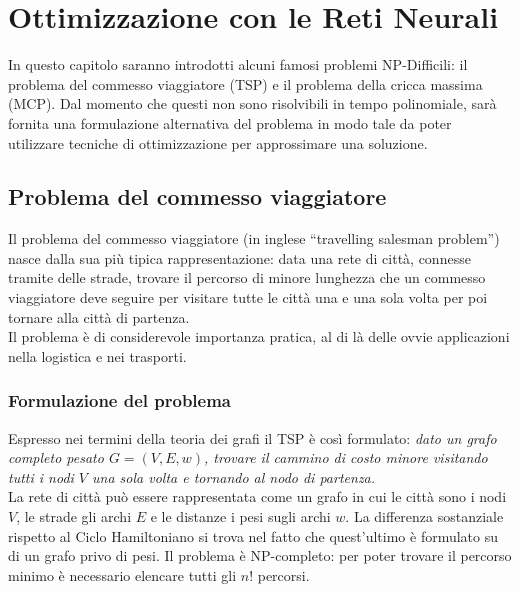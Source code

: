 
\chapter{Ottimizzazione con le Reti Neurali} %
\label{cha:ottimizzazione_con_le_reti_neurali}
In questo capitolo saranno introdotti alcuni famosi problemi NP-Difficili: il problema del commesso viaggiatore (TSP) e il problema della cricca massima (MCP). Dal momento che questi non sono risolvibili in tempo polinomiale, sarà fornita una formulazione alternativa del problema in modo tale da poter utilizzare tecniche di ottimizzazione per approssimare una soluzione.

\section{Problema del commesso viaggiatore} %
\label{sec:problema_del_commesso_viaggiatore}
Il problema del commesso viaggiatore (in inglese “travelling salesman problem”) nasce dalla sua più tipica rappresentazione: data una rete di città, connesse tramite delle strade, trovare il percorso di minore lunghezza che un commesso viaggiatore deve seguire per visitare tutte le città una e una sola volta per poi tornare alla città di partenza.\\

Il problema è di considerevole importanza pratica, al di là delle ovvie applicazioni nella logistica e nei trasporti.


\subsection{Formulazione del problema} %
\label{sub:formulazione_del_problema}
Espresso nei termini della teoria dei grafi il TSP è così formulato: \emph{dato un grafo completo pesato $G=(V, E, w)$, trovare il cammino di costo minore visitando tutti i nodi $V$ una sola volta e tornando al nodo di partenza.}\\

La rete di città può essere rappresentata come un grafo in cui le città sono i nodi $V$, le strade gli archi $E$ e le distanze i pesi sugli archi $w$. La differenza sostanziale rispetto al Ciclo Hamiltoniano si trova nel fatto che quest'ultimo è formulato su di un grafo privo di pesi. Il problema è NP-completo: per poter trovare il percorso minimo è necessario elencare tutti gli \textbf{$n!$} percorsi.

\newpage

